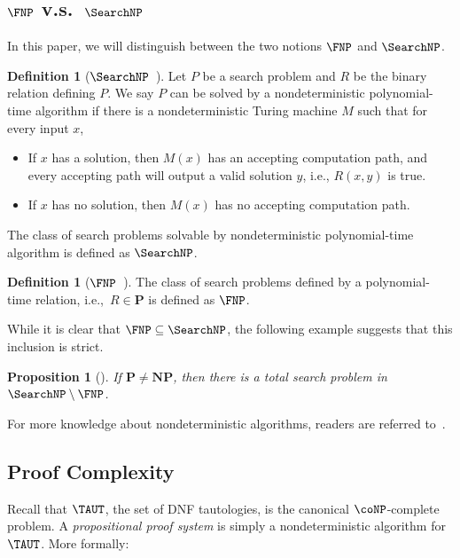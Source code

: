 \documentclass[10pt,a4paper]{article}
\newtheorem{proposition}[theorem]{Proposition}
\theoremstyle{definition}
\newtheorem{definition}[theorem]{Definition}
\theoremstyle{remark}
\begin{document}
\subsection{\texorpdfstring{$\FNP$}{FNP} v.s.~\texorpdfstring{$\SearchNP$}{SearchNP}}
In this paper, we will distinguish between the two notions $\FNP$ and $\SearchNP$.

\begin{definition}[$\SearchNP$~\cite{DBLP:conf/stoc/ChenL24}]
    Let $P$ be a search problem and $R$ be the binary relation defining $P$. We say $P$ can be solved by a nondeterministic polynomial-time algorithm if there is a nondeterministic Turing machine $M$ such that for every input $x$,
    \begin{itemize}
        \item If $x$ has a solution, then $M(x)$ has an accepting computation path, and every accepting path will output a valid solution $y$, i.e., $R(x,y)$ is true.
        \item If $x$ has no solution, then $M(x)$ has no accepting computation path.
    \end{itemize}
    The class of search problems solvable by nondeterministic polynomial-time algorithm is defined as $\SearchNP$.
\end{definition}

\begin{definition}[$\FNP$~\cite{DBLP:conf/stoc/ChenL24}]
    The class of search problems defined by a polynomial-time relation, i.e.,~$R\in \mathbf{P}$ is defined as $\FNP$.
\end{definition}

While it is clear that $\FNP\subseteq \SearchNP$, the following example suggests that this inclusion is strict.

\begin{proposition}[\cite{DBLP:conf/stoc/ChenL24}]
    If $\mathbf{P}\neq \mathbf{NP}$, then there is a total search problem in $\SearchNP\setminus \FNP$.
\end{proposition}

For more knowledge about nondeterministic algorithms, readers are referred to~\cite[Section 2.4]{DBLP:conf/stoc/ChenL24}.

\subsection{Proof Complexity}\label{sec: proof complexity}

Recall that $\TAUT$, the set of DNF tautologies, is the canonical $\coNP$-complete problem. A \emph{propositional proof system} is simply a nondeterministic algorithm for $\TAUT$. More formally:
\end{document}
